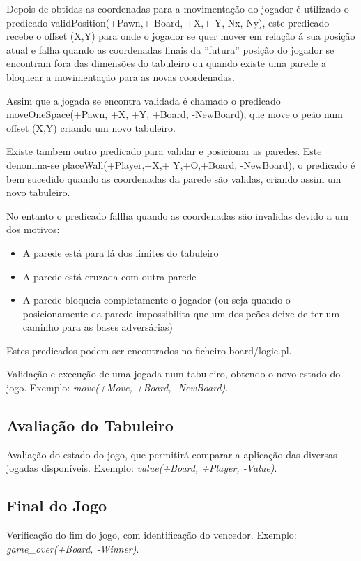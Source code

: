 \documentclass[a4paper]{article}
\begin{document}
Depois de obtidas as coordenadas para a movimentação do jogador é utilizado o predicado validPosition(+Pawn,+ Board, +X,+ Y,-Nx,-Ny), este predicado recebe o offset (X,Y) para onde o jogador se quer mover em relação á sua posição atual e falha quando as coordenadas finais da ''futura'' posição do jogador se encontram fora das dimensões do tabuleiro ou quando existe uma parede a bloquear a movimentação para as novas coordenadas.
\par Assim que a jogada se encontra validada é chamado o predicado moveOneSpace(+Pawn, +X, +Y, +Board, -NewBoard), que move o peão num offset (X,Y) criando um novo tabuleiro.
\par Existe tambem outro predicado para validar e posicionar as paredes. Este denomina-se placeWall(+Player,+X,+ Y,+O,+Board, -NewBoard),  o predicado é bem sucedido quando as coordenadas da parede são validas, criando assim um novo tabuleiro.
\par No entanto o predicado fallha quando as coordenadas são invalidas devido a um dos motivos:
\begin{itemize}
\item A parede está para lá dos limites do tabuleiro
\item A parede está cruzada com outra parede
\item A parede bloqueia completamente o jogador (ou seja quando o posicionamente da parede impossibilita que um dos peões deixe de ter um caminho para as bases adversárias)
\end{itemize}

Estes predicados podem ser encontrados no ficheiro board/logic.pl.


Validação e execução de uma jogada num tabuleiro, obtendo o novo estado do jogo. Exemplo: \textit{move(+Move, +Board, -NewBoard)}.

\subsection{Avaliação do Tabuleiro} Avaliação do estado do jogo, que permitirá comparar a aplicação das diversas jogadas disponíveis. Exemplo: \textit{value(+Board, +Player, -Value)}.

\subsection{Final do Jogo} Verificação do fim do jogo, com identificação do vencedor. Exemplo: \textit{game\_over(+Board, -Winner)}.
\end{document}
